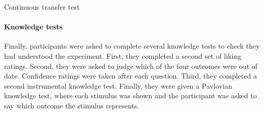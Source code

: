 \documentclass[12pt]{article}
\begin{document}
Continuous transfer test



\paragraph{Knowledge tests}
Finally, participants were asked to complete several knowledge tests to check
they had understood the experiment. First, they completed a second set of
liking ratings. Second, they were asked to judge which of the four outcomes 
were out of date. Confidence ratings were taken after each question. Third,
they completed a second instrumental knowledge test. Finally, they were given a
Pavlovian knowledge test, where each stimulus was shown and the participant was
asked to say which outcome the stimulus represents. 

\end{document}
